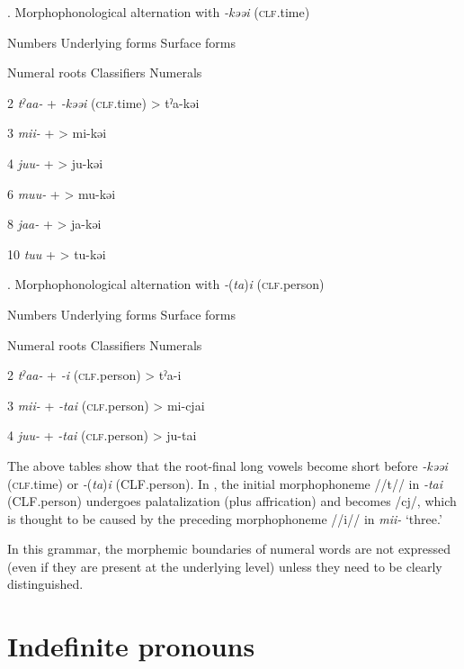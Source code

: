 \begin{styleBeschriftung}
\textmd{. Morphophonological alternation with} \textmd{\textit{{}-kəəi}}\textmd{ (\textsc{clf}.time)}
\end{styleBeschriftung}

Numbers  Underlying forms    Surface forms

  Numeral roots    Classifiers    Numerals

2  \textit{tˀaa-}  +  \textit{{}-kəəi} (\textsc{clf}.time)  >  tˀa-kəi

3  \textit{mii-}  +    >  mi-kəi

4  \textit{juu-}  +    >  ju-kəi

6  \textit{muu-}  +    >  mu-kəi

8  \textit{jaa-}  +    >  ja-kəi

10  \textit{tuu}  +    >  tu-kəi

\begin{styleBeschriftung}
\textmd{}\textmd{. Morphophonological alternation with} \textmd{\textit{{}-}}\textmd{(}\textmd{\textit{ta}}\textmd{)}\textmd{\textit{i}}\textmd{ (\textsc{clf}.person)}
\end{styleBeschriftung}

Numbers  Underlying forms    Surface forms

  Numeral roots    Classifiers    Numerals

2  \textit{tˀaa-}  +  \textit{{}-i} (\textsc{clf}.person)  >  tˀa-i

3  \textit{mii-}  +  \textit{{}-tai} (\textsc{clf}.person)  >  mi-cjai

4  \textit{juu-}  +  \textit{{}-tai} (\textsc{clf}.person)  >  ju-tai

The above tables show that the root-final long vowels become short before \textit{{}-kəəi} (\textsc{clf}.time) or \textit{{}-}(\textit{ta})\textit{i} (CLF.person). In , the initial morphophoneme //t// in \textit{{}-tai} (CLF.person) undergoes palatalization (plus affrication) and becomes /cj/, which is thought to be caused by the preceding morphophoneme //i// in \textit{mii-} ‘three.’

In this grammar, the morphemic boundaries of numeral words are not expressed (even if they are present at the underlying level) unless they need to be clearly distinguished.

\section{Indefinite pronouns}

